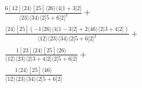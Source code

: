 \documentclass[varwidth, border=5pt]{standalone}
\begin{document}
\begin{my}
$\begin{gathered}
\scriptscriptstyle\frac{6[12]⟨24⟩[25]⟨26⟩⟨4|1+3|2]}{⟨23⟩⟨34⟩⟨2|5+6|2]^3}+\\
\scriptscriptstyle\frac{⟨24⟩[25](-1⟨26⟩⟨4|1-3|2]+2⟨46⟩⟨2|3+4|2])}{⟨12⟩⟨23⟩⟨34⟩⟨2|5+6|2]^2}+\\
\scriptscriptstyle\frac{1[23]⟨24⟩[25]⟨26⟩}{⟨12⟩⟨23⟩⟨2|3+4|2]⟨2|5+6|2]}+\\
\scriptscriptstyle\frac{1⟨24⟩[25]⟨46⟩}{⟨12⟩⟨23⟩⟨34⟩⟨2|5+6|2]}\phantom{+}
\end{gathered}$
\end{my}
\end{document}
